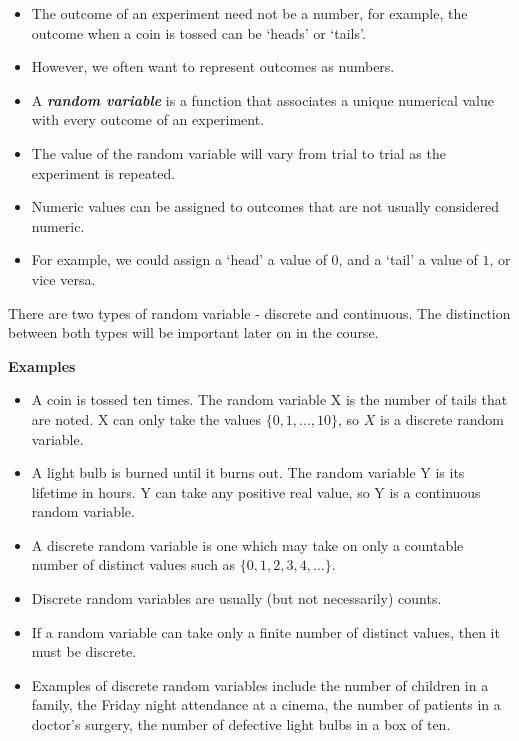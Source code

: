\documentclass[12pt]{report}
\begin{document}
		{\LARGE
			\begin{itemize} \item The outcome of an experiment need not be a number, for example, the outcome when a coin is tossed can be `heads' or `tails'. \item
				However, we often want to represent outcomes as numbers. \item
				A \textbf{\emph{random variable}} is a function that associates a unique numerical value with every outcome of an experiment.
				\item The value of the random variable will vary from trial to trial as the experiment is repeated.
				\item Numeric values can be assigned to outcomes that are not usually considered numeric. \item For example, we could assign a `head' a value of $0$, and a `tail' a value of $1$, or vice versa.
			\end{itemize}
		}
		{\LARGE
			There are two types of random variable - discrete and continuous. The distinction between both types will be important later on in the course.\\ \bigskip
			
			\textbf{Examples}
			\begin{itemize}
				\item A coin is tossed ten times. The random variable X is the number of tails that are noted.
				X can only take the values $\{0, 1, ..., 10\}$, so $X$ is a discrete random variable.
				\item A light bulb is burned until it burns out. The random variable Y is its lifetime in hours.
				Y can take any positive real value, so Y is a continuous random variable.
			\end{itemize}
		}
		
		{\LARGE
			\begin{itemize}
				\item A discrete random variable is one which may take on only a countable number of distinct values such as $\{0, 1, 2, 3, 4, ... \}$.\item Discrete random variables are usually (but not necessarily) counts. \item If a random variable can take only a finite number of distinct values, then it must be discrete. \item Examples of discrete random variables include the number of children in a family, the Friday night attendance at a cinema, the number of patients in a doctor's surgery, the number of defective light bulbs in a box of ten.
			\end{itemize}
		}
		
\end{document}
